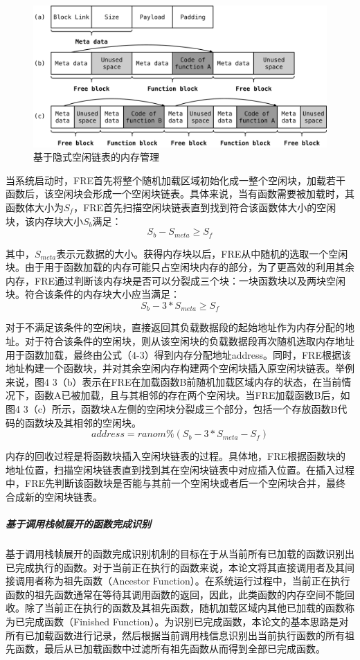 \documentclass[12pt,a4paper]{ctexart}
\numberwithin{figure}{section}
\begin{document}
\begin{figure}[h]
    \centering
    \includegraphics[scale=0.3]{graph/memoryManagement.png}
    \caption{基于隐式空闲链表的内存管理}
\end{figure}
\par 当系统启动时，FRE首先将整个随机加载区域初始化成一整个空闲块，加载若干函数后，该空闲块会形成一个空闲块链表。具体来说，当有函数需要被加载时，其函数体大小为$S_f$​，FRE首先扫描空闲块链表直到找到符合该函数体大小的空闲块，该内存块大小$S_b$​满足：
\[
    S_b-S_{meta}≥S_f
\]
\par 其中，$S_{meta}$表示元数据的大小。获得内存块以后，FRE从中随机的选取一个空闲块。由于用于函数加载的内存可能只占空闲块内存的部分，为了更高效的利用其余内存，FRE通过判断该内存块是否可以分裂成三个块：一块函数块以及两块空闲块。符合该条件的内存块大小应当满足：
\[
    S_b-3*S_{meta}≥S_f
\]
\par 对于不满足该条件的空闲块，直接返回其负载数据段的起始地址作为内存分配的地址。对于符合该条件的空闲块，则从该空闲块的负载数据段再次随机选取内存地址用于函数加载，最终由公式（4-3）得到内存分配地址address。同时，FRE根据该地址构建一个函数块，并对其余空闲内存构建两个空闲块插入原空闲块链表。举例来说，图4 3（b）表示在FRE在加载函数B前随机加载区域内存的状态，在当前情况下，函数A已被加载，且与其相邻的存在两个空闲块。当FRE加载函数B后，如图4 3（c）所示，函数块A左侧的空闲块分裂成三个部分，包括一个存放函数B代码的函数块及其相邻的空闲块。
\[
    address=ranom\%(S_b-3*S_{meta}-S_f)
\]
\par 内存的回收过程是将函数块插入空闲块链表的过程。具体地，FRE根据函数块的地址位置，扫描空闲块链表直到找到其在空闲块链表中对应插入位置。在插入过程中，FRE先判断该函数块是否能与其前一个空闲块或者后一个空闲块合并，最终合成新的空闲块链表。
\subparagraph{基于调用栈帧展开的函数完成识别}
\par 基于调用栈帧展开的函数完成识别机制的目标在于从当前所有已加载的函数识别出已完成执行的函数。对于当前正在执行的函数来说，本论文将其直接调用者及其间接调用者称为祖先函数（Ancestor Function）。在系统运行过程中，当前正在执行函数的祖先函数通常在等待其调用函数的返回，因此，此类函数的内存空间不能回收。除了当前正在执行的函数及其祖先函数，随机加载区域内其他已加载的函数称为已完成函数（Finished Function）。为识别已完成函数，本论文的基本思路是对所有已加载函数进行记录，然后根据当前调用栈信息识别出当前执行函数的所有祖先函数，最后从已加载函数中过滤所有祖先函数从而得到全部已完成函数。
\end{document}
